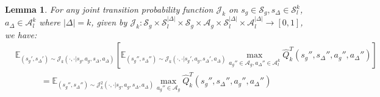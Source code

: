 \documentclass{article}
\theoremstyle{plain}
\newtheorem{lemma}[theorem]{Lemma}
\theoremstyle{definition}
\def\E{\mathbb{E}}
\begin{document}
\begin{lemma}\label{lemma: combining transition probabilities}
For any joint transition probability function $\mathcal{J}_k$ on $s_g\in\mathcal{S}_g, s_\Delta\in\mathcal{S}_l^k$, $a_\Delta\in\mathcal{A}_l^k$ where $|\Delta|=k$, given by $\mathcal{J}_k:\mathcal{S}_g\times\mathcal{S}_l^{|\Delta|}\times\mathcal{S}_g\times\mathcal{A}_g\times\mathcal{S}_l^{|\Delta|}\times\mathcal{A}_l^{|\Delta|}\to [0,1]$, we have:
\begin{align*}
&\E_{(s_g',s_\Delta')\sim\mathcal{J}_k(\cdot,\cdot|s_g,a_g,s_\Delta,a_\Delta)}\left[\E_{(s_g'',s_\Delta'')\sim\mathcal{J}_k(\cdot,\cdot|s_g',a_g,s_\Delta',a_\Delta)} \max_{a_g''\in\mathcal{A}_g,a_\Delta''\in\mathcal{A}_l^k}\hat{Q}_k^T(s_g'',s_\Delta'',a_g'',a_\Delta'')\right] \\ 
&\quad\quad\quad= \E_{(s_g'',s_\Delta'')\sim\mathcal{J}_k^2(\cdot,\cdot|s_g,a_g,s_\Delta,a_\Delta)} \max_{a_g''\in\mathcal{A}_g}\hat{Q}_{k}^T(s_g'',s_\Delta'',a_g'',a_\Delta'')
\end{align*}
\end{lemma}
\end{document}
